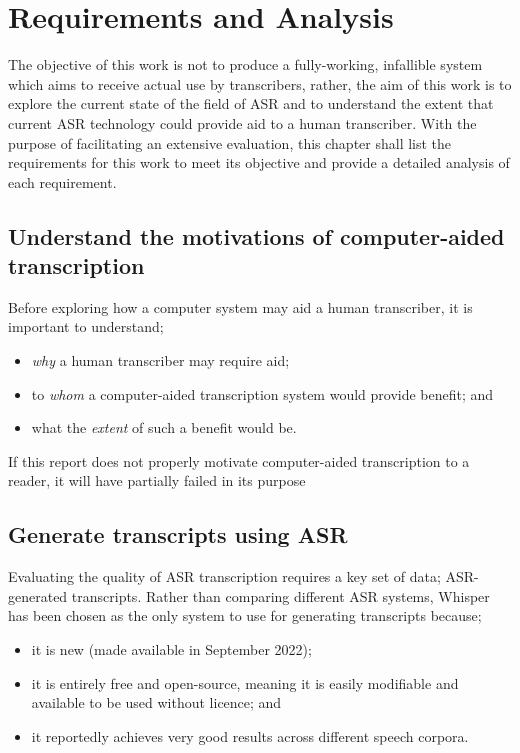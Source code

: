 \chapter{Requirements and Analysis}\label{ch:req-and-analysis}

The objective of this work is not to produce a fully-working, infallible system which aims to receive actual use by transcribers, rather, the aim of this work is to explore the current state of the field of ASR and to understand the extent that current ASR technology could provide aid to a human transcriber.
With the purpose of facilitating an extensive evaluation, this chapter shall list the requirements for this work to meet its objective and provide a detailed analysis of each requirement.

\section{Understand the motivations of computer-aided transcription}

Before exploring how a computer system may aid a human transcriber, it is important to understand;

\begin{itemize}
        \item \emph{why} a human transcriber may require aid;
        \item to \emph{whom} a computer-aided transcription system would provide benefit; and
        \item what the \emph{extent} of such a benefit would be.
\end{itemize}

If this report does not properly motivate computer-aided transcription to a reader, it will have partially failed in its purpose 

\section{Generate transcripts using ASR}

Evaluating the quality of ASR transcription requires a key set of data; ASR-generated transcripts.
Rather than comparing different ASR systems, Whisper\cite{whisper} has been chosen as the only system to use for generating transcripts because;

\begin{itemize}
        \item it is new (made available in September 2022);
        \item it is entirely free and open-source, meaning it is easily modifiable and available to be used without licence; and
        \item it reportedly achieves very good results across different speech corpora.
\end{itemize}

